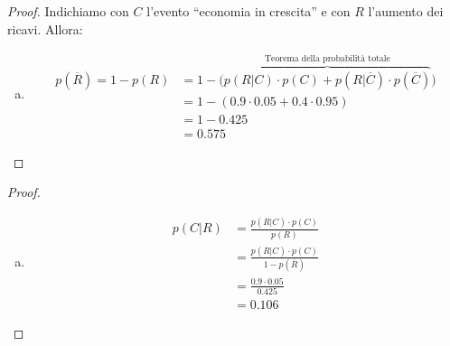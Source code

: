 \documentclass{beamer}
\renewcommand\qedsymbol{$\blacksquare$}
\begin{document}
\begin{frame}[fragile]
	\begin{proof}\renewcommand{\qedsymbol}{$\square$}
		Indichiamo con $C$ l'evento ``economia in crescita'' e con $R$ l'aumento dei ricavi. Allora:
		\begin{enumerate}[(a)]
			\item \begin{align*}
				      p(\overline R) = 1 - p(R) & = 1 - \big( \overbrace{p(R|C) \cdot p(C) + p(R|\overline C) \cdot p(\overline C)}^{\text{Teorema della probabilità totale}} \big) \\
				      & = 1 - (0.9 \cdot 0.05 + 0.4 \cdot 0.95 ) \\
				      & = 1 - 0.425 \\
				      & = 0.575
			      \end{align*}
		\end{enumerate}
	\end{proof}
\end{frame}

\begin{frame}[fragile]
	\begin{proof}%
		\begin{enumerate}[(b)]
			\item \begin{align*}
				      p(C|R) & = \frac{p(R|C)\cdot p(C)}{p(R)} \\
				      & = \frac{p(R|C) \cdot p(C)}{1 - p(\overline R)} \\ %
				      & = \frac{0.9\cdot 0.05}{0.425} \\
				      & = 0.106
			      \end{align*}
		\end{enumerate}

	\end{proof}
\end{frame}
\end{document}
